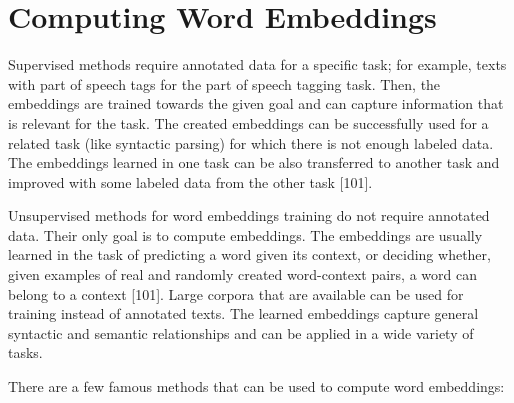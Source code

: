 \documentclass[11pt,openany,executivepaper]{book}
\begin{document}
\section{Computing Word Embeddings}
Supervised methods require annotated data for a specific task; for example, texts with part of speech tags for the part of speech tagging task. Then, the embeddings are trained towards the given goal and can capture information that is relevant for the task. The created embeddings can be successfully used for a related task (like syntactic parsing) for which there is not enough labeled data. The embeddings learned in one task can be also transferred to another task and improved with some labeled data from the other task [101].

Unsupervised methods for word embeddings training do not require annotated data. Their only goal is to compute embeddings. The embeddings are usually learned in the task of predicting a word given its context, or deciding whether, given examples of real and randomly created word-context pairs, a word can belong to a context [101]. Large corpora that are available can be used for training instead of annotated texts. The learned embeddings capture general syntactic and semantic relationships and can be applied in a wide variety of tasks.

There are a few famous methods that can be used to compute word embeddings:
\end{document}
